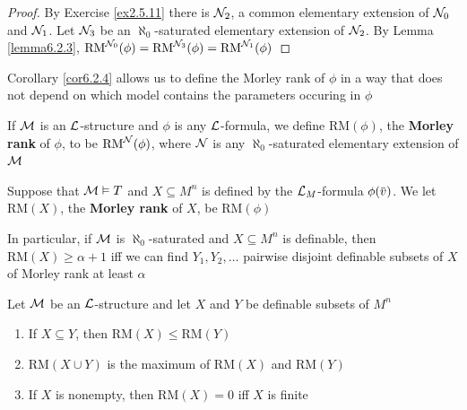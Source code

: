 \documentclass[11pt]{article}
\def \RM {\text{RM}}
\begin{document}
\begin{proof}
By Exercise \ref{ex2.5.11} there is \(\mathcal{N}_2\), a common elementary extension of \(\mathcal{N}_0\) and \(\mathcal{N}_1\).
Let \(\mathcal{N}_3\) be an \(\aleph_0\)-saturated elementary extension of \(\mathcal{N}_2\). By Lemma
\ref{lemma6.2.3}, \(\RM^{\caln_0}(\phi)=\RM^{\caln_3}(\phi)=\RM^{\caln_1}(\phi)\)
\end{proof}

Corollary \ref{cor6.2.4} allows us to define the Morley rank of \(\phi\) in a way that does not depend on
which model contains the parameters occuring in \(\phi\)

\begin{definition}[]
If \(\mathcal{M}\) is an \(\mathcal{L}\)-structure and \(\phi\) is any \(\mathcal{L}\)-formula, we define \(\RM(\phi)\), the \textbf{Morley rank}
of \(\phi\), to be \(\RM^{\caln}(\phi)\), where \(\mathcal{N}\) is any \(\aleph_0\)-saturated elementary extension of \(\mathcal{M}\)
\end{definition}

\begin{definition}[]
Suppose that \(\mathcal{M}\vDash T\) and \(X\subseteq M^n\) is defined by the \(\mathcal{L}_M\)-formula \(\phi(\barv)\). We
let \(\RM(X)\), the \textbf{Morley rank} of \(X\), be \(\RM(\phi)\)
\end{definition}

In particular, if \(\mathcal{M}\) is \(\aleph_0\)-saturated and \(X\subseteq M^n\) is definable, then \(\RM(X)\ge\alpha+1\) iff
we can find \(Y_1,Y_2,\dots\) pairwise disjoint definable subsets of \(X\) of Morley rank at least
\(\alpha\)

\begin{lemma}[]
\label{lemma6.2.7}
Let \(\mathcal{M}\) be an \(\mathcal{L}\)-structure and let \(X\) and \(Y\) be definable subsets of \(M^n\)
\begin{enumerate}
\item If \(X\subseteq Y\), then \(\RM(X)\le\RM(Y)\)
\item \(\RM(X\cup Y)\) is the maximum of \(\RM(X)\) and \(\RM(Y)\)
\item If \(X\) is nonempty, then \(\RM(X)=0\) iff \(X\) is finite
\end{enumerate}
\end{lemma}
\end{document}
